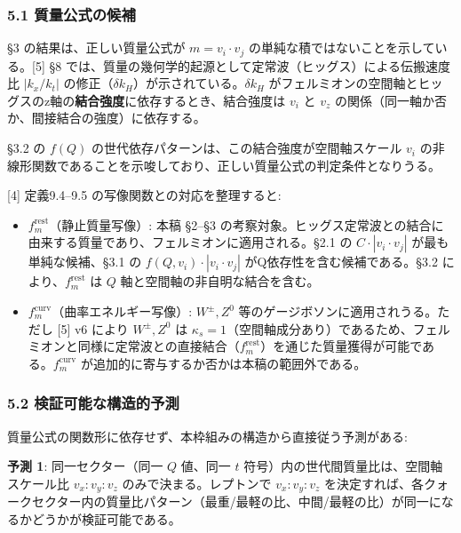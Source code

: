 \documentclass[
  a4paper,11pt]{ltjsarticle}
\providecommand{\tightlist}{%
  \setlength{\itemsep}{0pt}\setlength{\parskip}{0pt}}
\begin{document}
\subsubsection{5.1
質量公式の候補}\label{ux8ceaux91cfux516cux5f0fux306eux5019ux88dc}

§3 の結果は、正しい質量公式が \(m = v_i \cdot v_j\)
の単純な積ではないことを示している。{[}5{]} §8
では、質量の幾何学的起源として定常波（ヒッグス）による伝搬速度比
\(|k_x / k_t|\) の修正（\(\delta k_H\)）が示されている。\(\delta k_H\)
がフェルミオンの空間軸とヒッグスのz軸の\textbf{結合強度}に依存するとき、結合強度は
\(v_i\) と \(v_z\) の関係（同一軸か否か、間接結合の強度）に依存する。

§3.2 の \(f(Q)\) の世代依存パターンは、この結合強度が空間軸スケール
\(v_i\)
の非線形関数であることを示唆しており、正しい質量公式の判定条件となりうる。

{[}4{]} 定義9.4--9.5 の写像関数との対応を整理すると:

\begin{itemize}
\tightlist
\item
  \textbf{\(f_m^{\text{rest}}\)}（静止質量写像）: 本稿 §2--§3
  の考察対象。ヒッグス定常波との結合に由来する質量であり、フェルミオンに適用される。§2.1
  の \(C \cdot |v_i \cdot v_j|\) が最も単純な候補、§3.1 の
  \(f(Q, v_i) \cdot |v_i \cdot v_j|\) がQ依存性を含む候補である。§3.2
  により、\(f_m^{\text{rest}}\) は \(Q\)
  軸と空間軸の非自明な結合を含む。
\item
  \textbf{\(f_m^{\text{curv}}\)}（曲率エネルギー写像）: \(W^{\pm}, Z^0\)
  等のゲージボソンに適用されうる。ただし {[}5{]} v6 により
  \(W^{\pm}, Z^0\) は
  \(\kappa_s = 1\)（空間軸成分あり）であるため、フェルミオンと同様に定常波との直接結合（\(f_m^{\text{rest}}\)）を通じた質量獲得が可能である。\(f_m^{\text{curv}}\)
  が追加的に寄与するか否かは本稿の範囲外である。
\end{itemize}

\subsubsection{5.2
検証可能な構造的予測}\label{ux691cux8a3cux53efux80fdux306aux69cbux9020ux7684ux4e88ux6e2c}

質量公式の関数形に依存せず、本枠組みの構造から直接従う予測がある:

\textbf{予測 1}: 同一セクター（同一 \(Q\) 値、同一 \(t\)
符号）内の世代間質量比は、空間軸スケール比 \(v_x : v_y : v_z\)
のみで決まる。レプトンで \(v_x : v_y : v_z\)
を決定すれば、各クォークセクター内の質量比パターン（最重/最軽の比、中間/最軽の比）が同一になるかどうかが検証可能である。
\end{document}
